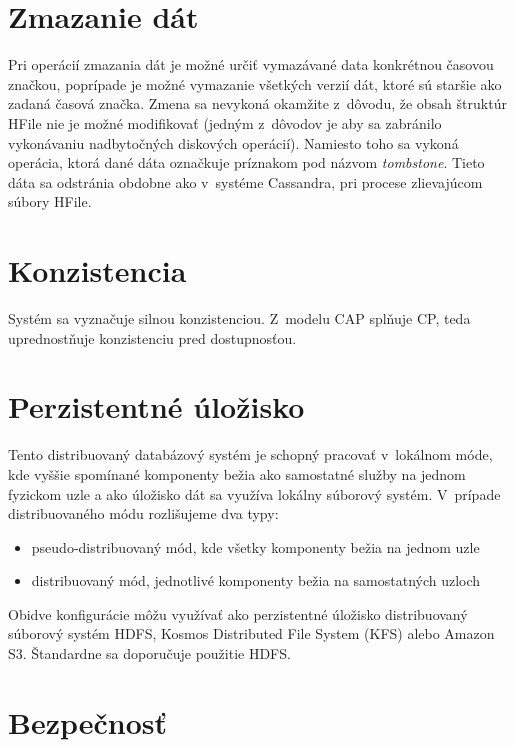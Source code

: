 \documentclass[11pt,twoside,a4paper]{book}
\begin{document}
\section{Zmazanie dát}

Pri operácií zmazania dát je možné určiť vymazávané data konkrétnou časovou značkou, poprípade je možné vymazanie všetkých verzií dát, ktoré sú staršie ako zadaná časová značka. Zmena sa nevykoná okamžite z~dôvodu, že obsah štruktúr HFile nie je možné modifikovať (jedným z~dôvodov je aby sa zabránilo vykonávaniu nadbytočných diskových operácií). Namiesto toho sa vykoná operácia, ktorá dané dáta označkuje príznakom pod názvom \emph{tombstone}. Tieto dáta sa odstránia obdobne ako v~systéme Cassandra, pri procese zlievajúcom súbory HFile.

\section{Konzistencia}

Systém sa vyznačuje silnou konzistenciou. Z~modelu CAP splňuje CP, teda uprednostňuje konzistenciu pred dostupnosťou.



\section{Perzistentné úložisko}

Tento distribuovaný databázový systém je schopný pracovať v~lokálnom móde, kde vyššie spomínané komponenty bežia ako samostatné služby na jednom fyzickom uzle a ako úložisko dát sa využíva lokálny súborový systém. V~prípade distribuovaného módu rozlišujeme dva typy:
\begin{itemize}
 \item pseudo-distribuovaný mód, kde všetky komponenty bežia na jednom uzle
 \item distribuovaný mód, jednotlivé komponenty bežia na samostatných uzloch
\end{itemize}

Obidve konfigurácie môžu využívať ako perzistentné úložisko distribuovaný súborový systém HDFS, Kosmos Distributed File System (KFS) alebo Amazon S3. Štandardne sa doporučuje použitie HDFS.



\section{Bezpečnosť}
\end{document}
